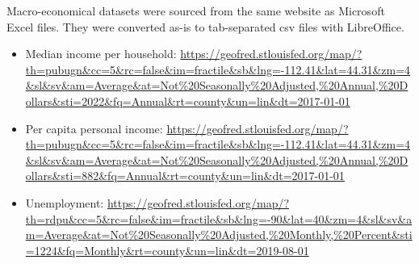 \documentclass[11pt,]{report}
\begin{document}
Macro-economical datasets were sourced from the same website as Microsoft Excel files. They were converted as-is to tab-separated csv files with LibreOffice.

\begin{itemize}
\item
  Median income per household:
  \url{https://geofred.stlouisfed.org/map/?th=pubugn\&cc=5\&rc=false\&im=fractile\&sb\&lng=-112.41\&lat=44.31\&zm=4\&sl\&sv\&am=Average\&at=Not\%20Seasonally\%20Adjusted,\%20Annual,\%20Dollars\&sti=2022\&fq=Annual\&rt=county\&un=lin\&dt=2017-01-01}
\item
  Per capita personal income:
  \url{https://geofred.stlouisfed.org/map/?th=pubugn\&cc=5\&rc=false\&im=fractile\&sb\&lng=-112.41\&lat=44.31\&zm=4\&sl\&sv\&am=Average\&at=Not\%20Seasonally\%20Adjusted,\%20Annual,\%20Dollars\&sti=882\&fq=Annual\&rt=county\&un=lin\&dt=2017-01-01}
\item
  Unemployment:
  \url{https://geofred.stlouisfed.org/map/?th=rdpu\&cc=5\&rc=false\&im=fractile\&sb\&lng=-90\&lat=40\&zm=4\&sl\&sv\&am=Average\&at=Not\%20Seasonally\%20Adjusted,\%20Monthly,\%20Percent\&sti=1224\&fq=Monthly\&rt=county\&un=lin\&dt=2019-08-01}
\end{itemize}

\small
\end{document}
